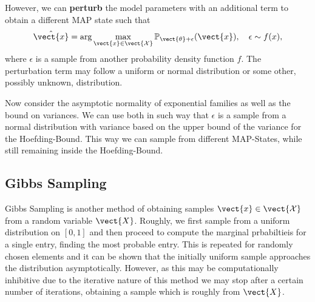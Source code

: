 However, we can \textbf{perturb} the model parameters with an additional term to obtain a different MAP state such that 
\begin{equation}
    \hat{\vect{x}}  = \arg\max_{\vect{x} \in \vect{\mathcal{X}}} \mathbb{P}_{\vect{\theta} + \epsilon}(\vect{x}), \quad \epsilon \sim f(x),
\end{equation}
where $\epsilon$ is a sample from another probability density function $f$.
The perturbation term may follow a uniform or normal distribution or some other, possibly unknown, distribution.

Now consider the asymptotic normality of exponential families as well as the bound on variances. 
We can use both in such way that $\epsilon$ is a sample from a normal distribution with variance based on the upper bound of the variance for the Hoefding-Bound.
This way we can sample from different MAP-States, while still remaining inside the Hoefding-Bound.

\subsection{Gibbs Sampling}
Gibbs Sampling is another method of obtaining samples $\vect{x} \in \vect{\mathcal{X}}$ from a random variable $\vect{X}$. 
Roughly, we first sample from a uniform distribution on $[0,1]$ and then proceed to compute the marginal prbabiltieis for a single entry, finding the most probable entry.
This is repeated for randomly chosen elements and it can be shown that the initially uniform sample approaches the distribution asymptotically.
However, as this may be computationally inhibitive due to the iterative nature of this method we may stop after a certain number of iterations, obtaining a sample which is roughly from $\vect{X}$.
